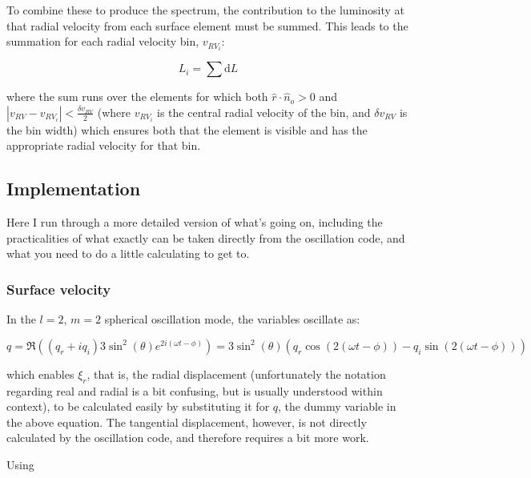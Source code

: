 \documentclass[11pt]{amsart}
\begin{document}
To combine these to produce the spectrum, the contribution to the luminosity at that radial velocity from each surface element must be summed.  This leads to the summation for each radial velocity bin, $v_{RV_{i}}$:

\begin{equation}
L_{i} = \sum \text{d}L
\end{equation}

where the sum runs over the elements for which both $\hat{r} \cdot \hat{n}_{o} > 0$ and $| v_{RV} - v_{RV_{i}} | < \frac{\delta v_{RV}}{2}$ (where $v_{RV_{i}}$ is the central radial velocity of the bin, and $\delta v_{RV}$ is the bin width) which ensures both that the element is visible and has the appropriate radial velocity for that bin.



\subsection{Implementation} \label{RV:Implementation}

Here I run through a more detailed version of what's going on, including the practicalities of what exactly can be taken directly from the oscillation code, and what you need to do a little calculating to get to.

\subsubsection{Surface velocity} \label{RV:Implementation:SurfVel}

In the $l=2$, $m=2$ spherical oscillation mode, the variables oscillate as:

\begin{equation}
q = \Re \left(  \left( q_{r} + i q_{i} \right)  3 \sin^{2}(\theta) e^{2 i ( \omega t - \phi)}   \right)   =    3 \sin^{2}(\theta) \left(  q_{r} \cos \left( 2 ( \omega t - \phi) \right)  - q_{i} \sin \left( 2 ( \omega t - \phi) \right) \right) 
\end{equation}

which enables $\xi_{r}$, that is, the radial displacement (unfortunately the notation regarding real and radial is a bit confusing, but is usually understood within context), to be calculated easily by substituting it for $q$, the dummy variable in the above equation.  The tangential displacement, however, is not directly calculated by the oscillation code, and therefore requires a bit more work.

Using
\end{document}
